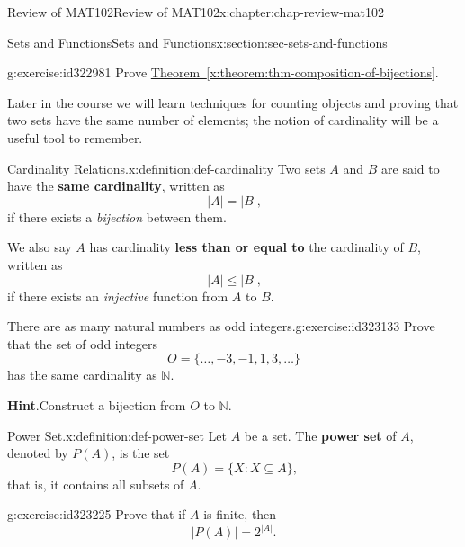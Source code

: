 \documentclass[oneside,10pt,]{book}
\newcommand{\blocktitlefont}{\relax}
\newcommand{\xreffont}{\relax}
\newcommand{\terminology}[1]{\textbf{#1}}
\numberwithin{equation}{section}
\begin{document}
\begin{chapterptx}{Review of MAT102}{}{Review of MAT102}{}{}{x:chapter:chap-review-mat102}
\begin{sectionptx}{Sets and Functions}{}{Sets and Functions}{}{}{x:section:sec-sets-and-functions}
\begin{inlineexercise}{}{g:exercise:id322981}
Prove \hyperref[x:theorem:thm-composition-of-bijections]{Theorem~{\xreffont\ref{x:theorem:thm-composition-of-bijections}}}.%
\end{inlineexercise}
Later in the course we will learn techniques for counting objects and proving that two sets have the same number of elements; the notion of cardinality will be a useful tool to remember.%
\begin{definition}{Cardinality Relations.}{x:definition:def-cardinality}%
\label{g:notation:id323012}%
\label{g:notation:id323008}%
Two sets \(A\) and \(B\) are said to have the \terminology{same cardinality}, written as%
\begin{equation*}
|A| = |B|\text{,}
\end{equation*}
if there exists a \emph{bijection} between them.%
\par
We also say \(A\) has cardinality \terminology{less than or equal to} the cardinality of \(B\), written as%
\begin{equation*}
|A| \leq |B|\text{,}
\end{equation*}
if there exists an \emph{injective} function from \(A\) to \(B\).%
\end{definition}
\begin{inlineexercise}{There are as many natural numbers as odd integers.}{g:exercise:id323133}%
Prove that the set of odd integers%
\begin{equation*}
O = \{\ldots,-3,-1,1,3,\ldots\}
\end{equation*}
has the same cardinality as \(\mathbb{N}\).%
\par\smallskip%
\noindent\textbf{\blocktitlefont Hint}.\hypertarget{g:hint:id323158}{}\quad{}Construct a bijection from \(O\) to \(\mathbb{N}\).%
\end{inlineexercise}
\begin{definition}{Power Set.}{x:definition:def-power-set}%
\label{g:notation:id323197}%
Let \(A\) be a set. The \terminology{power set} of \(A\), denoted by \(P(A)\), is the set%
\begin{equation*}
P(A) = \{X : X \subseteq A\}\text{,}
\end{equation*}
that is, it contains all subsets of \(A\).%
\end{definition}
\begin{inlineexercise}{}{g:exercise:id323225}%
Prove that if \(A\) is finite, then%
\begin{equation*}
|P(A)| = 2^{|A|}\text{.}
\end{equation*}
%
\end{inlineexercise}

\end{sectionptx}
\end{chapterptx}
\end{document}
